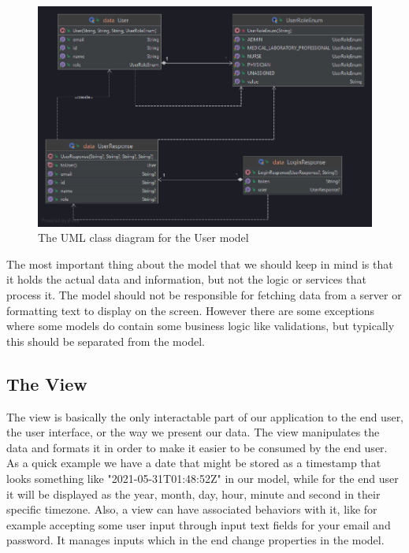 \begin{figure}
\centering
\includegraphics[width=\textwidth]{figures/user_uml.png}
\caption{The UML class diagram for the User model}
\label{fig:user-uml}
\end{figure}

The most important thing about the model that we should keep in mind is that it holds the actual data and information, but not the logic or services that process it. The model should not be responsible for fetching data from a server or formatting text to display on the screen. However there are some exceptions where some models do contain some business logic like validations, but typically this should be separated from the model.

\subsection{The View}
\label{subsec:ch3sec1subsec2}

\par The view is basically the only interactable part of our application to the end user, the user interface, or the way we present our data. The view manipulates the data and formats it in order to make it easier to be consumed by the end user. As a quick example we have a date that might be stored as a timestamp that looks something like "2021-05-31T01:48:52Z" in our model, while for the end user it will be displayed as the year, month, day, hour, minute and second in their specific timezone. Also, a view can have associated behaviors with it, like for example accepting some user input through input text fields for your email and password. It manages inputs which in the end change properties in the model.

